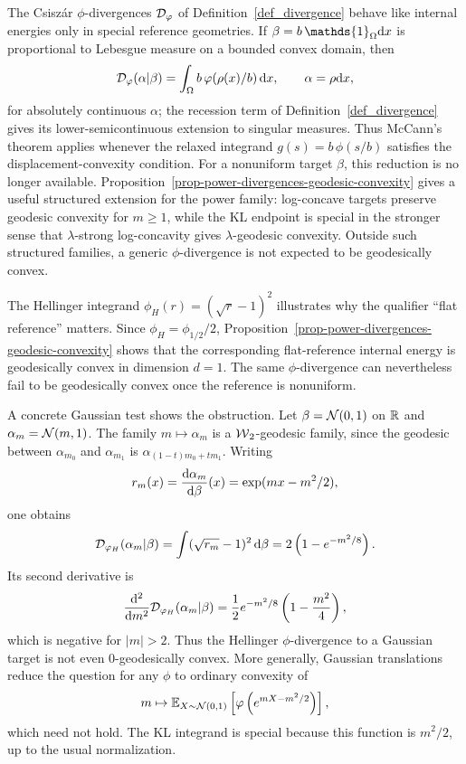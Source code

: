 \begin{rem}\label{rem-phi-divergence-geodesic-convexity}
	The Csisz\'ar \(\phi\)-divergences \(\mathcal{D}_\varphi\) of Definition~\ref{def_divergence} behave like internal energies only in special reference geometries. If \(\beta=b\,\mathds{1}_{\Omega}\d x\) is proportional to Lebesgue measure on a bounded convex domain, then
	\[
	\mathcal{D}_\varphi(\alpha|\beta)
	=
	\int_{\Omega} b\,\varphi(\rho(x)/b)\,\mathrm{d} x,
	\qquad \alpha=\rho\mathrm{d} x,
	\]
	for absolutely continuous \(\alpha\); the recession term of Definition~\ref{def_divergence} gives its lower-semicontinuous extension to singular measures. Thus McCann's theorem applies whenever the relaxed integrand \(g(s)=b\,\phi(s/b)\) satisfies the displacement-convexity condition. For a nonuniform target \(\beta\), this reduction is no longer available. Proposition~\ref{prop-power-divergences-geodesic-convexity} gives a useful structured extension for the power family: log-concave targets preserve geodesic convexity for \(m\geq1\), while the KL endpoint is special in the stronger sense that \(\lambda\)-strong log-concavity gives \(\lambda\)-geodesic convexity. Outside such structured families, a generic \(\phi\)-divergence is not expected to be geodesically convex.

	The Hellinger integrand \(\phi_H(r)=(\sqrt r-1)^2\) illustrates why the qualifier ``flat reference'' matters. Since \(\phi_H=\phi_{1/2}/2\), Proposition~\ref{prop-power-divergences-geodesic-convexity} shows that the corresponding flat-reference internal energy is geodesically convex in dimension \(d=1\). The same \(\phi\)-divergence can nevertheless fail to be geodesically convex once the reference is nonuniform.

	A concrete Gaussian test shows the obstruction. Let \(\beta=\mathcal{N}(0,1)\) on \(\mathbb{R}\) and \(\alpha_m=\mathcal{N}(m,1)\). The family \(m\mapsto\alpha_m\) is a \(\operatorname{\mathcal{W}}_2\)-geodesic family, since the geodesic between \(\alpha_{m_0}\) and \(\alpha_{m_1}\) is \(\alpha_{(1-t)m_0+t m_1}\). Writing
	\[
		r_m(x)=\frac{\mathrm{d}\alpha_m}{\mathrm{d}\beta}(x)=\exp(mx-m^2/2),
	\]
	one obtains
	\[
		\mathcal{D}_{\varphi_H}(\alpha_m|\beta)
		=
		\int(\sqrt{r_m}-1)^2\,\mathrm{d}\beta
		=
		2\left(1-e^{-m^2/8}\right).
	\]
	Its second derivative is
	\[
		\frac{\mathrm{d}^2}{\mathrm{d} m^2}\mathcal{D}_{\varphi_H}(\alpha_m|\beta)
		=
		\frac12 e^{-m^2/8}\left(1-\frac{m^2}{4}\right),
	\]
	which is negative for \(|m|>2\). Thus the Hellinger \(\phi\)-divergence to a Gaussian target is not even \(0\)-geodesically convex. More generally, Gaussian translations reduce the question for any \(\phi\) to ordinary convexity of
	\[
		m\mapsto
		\mathbb{E}_{X\sim\mathcal{N}(0,1)}
		\left[\varphi\left(e^{mX-m^2/2}\right)\right],
	\]
	which need not hold. The KL integrand is special because this function is \(m^2/2\), up to the usual normalization.
\end{rem}

